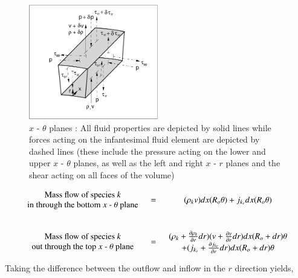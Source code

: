 \begin{figure}[ht]
\includegraphics[height=5cm]{./rdir.eps}
\caption[$x$ - $\theta$ planes]{$x$ - $\theta$ planes : All fluid properties are depicted by solid lines while 
				forces acting on the infantesimal fluid element are depicted by dashed lines (these include
				the pressure acting on the lower and upper $x$ - $\theta$ planes, as well as the left
				and right $x$ - $r$ planes and the shear acting on all faces of the volume)}
\label{fig:rdir}
\end{figure}

\begin{displaymath}
	\begin{array}{ccc}
		\begin{array}{c}
			\textrm{Mass flow of species \emph{k}} \\ \textrm{in through the bottom $x$ - $\theta$ plane} 
		\end{array} & 
	= & (\rho_k v)dx(R_o \theta) + j_{k_r} dx(R_o \theta)\\
	& \\ & \\
		\begin{array}{c}
			\textrm{Mass flow of species \emph{k}} \\ \textrm{out through the top $x$ - $\theta$ plane}
		\end{array} & 
	= & \begin{array}{c}
		(\rho_k + \frac{\partial \rho_k}{\partial r}dr)(v + \frac{\partial v}{\partial r}dr)dx
		(R_o + dr) \theta  \\
	+ (j_{k_r} + \frac{\partial j_{k_r}}{\partial r}dr)dx (R_o + dr) \theta
		\end{array}
	\end{array}
\end{displaymath}

	Taking the difference between the outflow and inflow in the $r$ direction yields,

